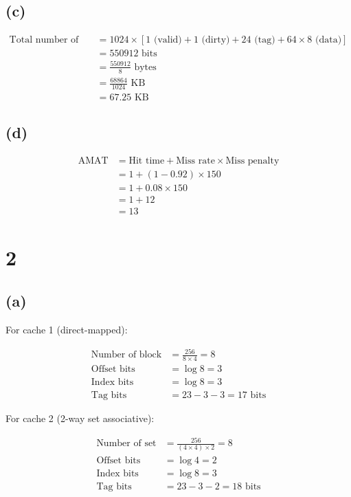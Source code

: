 \documentclass[12pt]{article}
\begin{document}
\subsection*{(c)}

\begin{align*}
    \text{Total number of KB} &= 1024 \times [1 \text{ (valid)} + 1 \text{ (dirty)} + 24 \text{ (tag)} + 64 \times 8 \text{ (data)}] \\
    &= 550912 \text{ bits} \\
    &= \frac{550912}{8} \text{ bytes} \\
    &= \frac{68864}{1024} \text{ KB} \\
    &= 67.25 \text{ KB}
\end{align*}

\subsection*{(d)}

\begin{align*}
    \text{AMAT} &= \text{Hit time} + \text{Miss rate} \times \text{Miss penalty} \\
    &= 1 + (1 - 0.92) \times 150 \\
    &= 1 + 0.08 \times 150 \\
    &= 1 + 12 \\
    &= 13
\end{align*}

\section*{2}

\subsection*{(a)}

For cache 1 (direct-mapped):

\begin{align*}
    \text{Number of block} &= \frac{256}{8 \times 4} = 8 \\
    \text{Offset bits} &= \log 8 = 3 \\
    \text{Index bits} &= \log 8 = 3 \\
    \text{Tag bits} &= 23 - 3 - 3 = 17 \text{ bits}
\end{align*}

For cache 2 (2-way set associative):

\begin{align*}
    \text{Number of set} &= \frac{256}{(4 \times 4) \times 2} = 8 \\
    \text{Offset bits} &= \log 4 = 2 \\
    \text{Index bits} &= \log 8 = 3 \\
    \text{Tag bits} &= 23 - 3 - 2 = 18 \text{ bits}
\end{align*}
\end{document}
